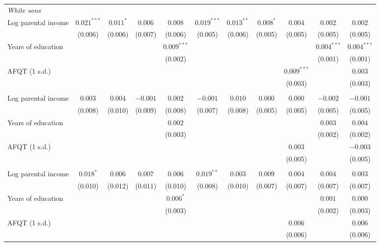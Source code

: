 \begin{table}[!htbp]
{{\begin{tabular}{lcccccccccc}
\midrule
\multicolumn{11}{l}{\textit{White sons}} \\
Log parental income & $0.021^{***}$ & $0.011^{*}$ & $0.006$ & $0.008$ & $0.019^{***}$ & $0.013^{**}$ & $0.008^{*}$ & $0.004$ & $0.002$ & $0.002$ \\
 & (0.006) & (0.006) & (0.007) & (0.006) & (0.005) & (0.006) & (0.005) & (0.005) & (0.005) & (0.005) \\
Years of education &  &  &  & $0.009^{***}$ &  &  &  &  & $0.004^{***}$ & $0.004^{***}$ \\
 &  &  &  & (0.002) &  &  &  &  & (0.001) & (0.001) \\
AFQT (1 s.d.) &  &  &  &  &  &  &  & $0.009^{***}$ &  & $0.003$ \\
 &  &  &  &  &  &  &  & (0.003) &  & (0.003) \\
\addlinespace
\multicolumn{11}{l}{\textit{Black sons}} \\
Log parental income & $0.003$ & $0.004$ & $-0.001$ & $0.002$ & $-0.001$ & $0.010$ & $0.000$ & $0.000$ & $-0.002$ & $-0.001$ \\
 & (0.008) & (0.010) & (0.009) & (0.008) & (0.007) & (0.008) & (0.005) & (0.005) & (0.005) & (0.005) \\
Years of education &  &  &  & $0.002$ &  &  &  &  & $0.003$ & $0.004$ \\
 &  &  &  & (0.003) &  &  &  &  & (0.002) & (0.002) \\
AFQT (1 s.d.) &  &  &  &  &  &  &  & $0.003$ &  & $-0.003$ \\
 &  &  &  &  &  &  &  & (0.005) &  & (0.005) \\
\addlinespace
\multicolumn{11}{l}{\textit{White $-$ Black}} \\
Log parental income & $0.018^{*}$ & $0.006$ & $0.007$ & $0.006$ & $0.019^{**}$ & $0.003$ & $0.009$ & $0.004$ & $0.004$ & $0.003$ \\
 & (0.010) & (0.012) & (0.011) & (0.010) & (0.008) & (0.010) & (0.007) & (0.007) & (0.007) & (0.007) \\
Years of education &  &  &  & $0.006^{*}$ &  &  &  &  & $0.001$ & $0.000$ \\
 &  &  &  & (0.003) &  &  &  &  & (0.002) & (0.003) \\
AFQT (1 s.d.) &  &  &  &  &  &  &  & $0.006$ &  & $0.006$ \\
 &  &  &  &  &  &  &  & (0.006) &  & (0.006) \\
\bottomrule
\end{tabular}}}
\par\smallskip

\end{table}
